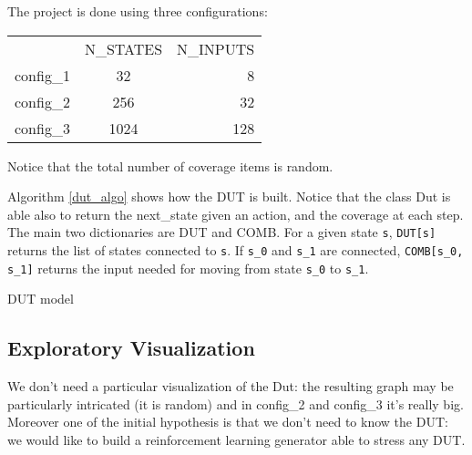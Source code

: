 \documentclass{article}
\begin{document}
The project is done using three configurations: 
\begin{center}
  \begin{tabular}{ | l | c | r | }
    \hline
      & N\_STATES & N\_INPUTS \\
    config\_1 &   32 &    8 \\
    config\_2 &  256 &   32 \\
    config\_3 & 1024 &  128 \\
    \hline
  \end{tabular}
\end{center}
Notice that the total number of coverage items is random.

Algorithm \ref{dut_algo} shows how the DUT is built. Notice that the class Dut is able also to return the next\_state given an action, and the coverage at each step. The main two dictionaries are DUT and COMB. For a given state \texttt{s}, \texttt{DUT[s]} returns the list of states connected to \texttt{s}. If \texttt{s\_0} and \texttt{s\_1} are connected, \texttt{COMB[s\_0, s\_1]} returns the input needed for moving from state \texttt{s\_0} to \texttt{s\_1}.

\begin{algorithm}[H]

 \caption{DUT model}
 \label{dut_algo}
\end{algorithm}

\subsection{Exploratory Visualization}
% 
% 
% 
We don't need a particular visualization of the Dut: the resulting graph may be particularly intricated (it is random) and in config\_2 and config\_3 it's really big. Moreover one of the initial hypothesis is that we don't need to know the DUT: we would like to build a reinforcement learning generator able to stress any DUT.
\end{document}
